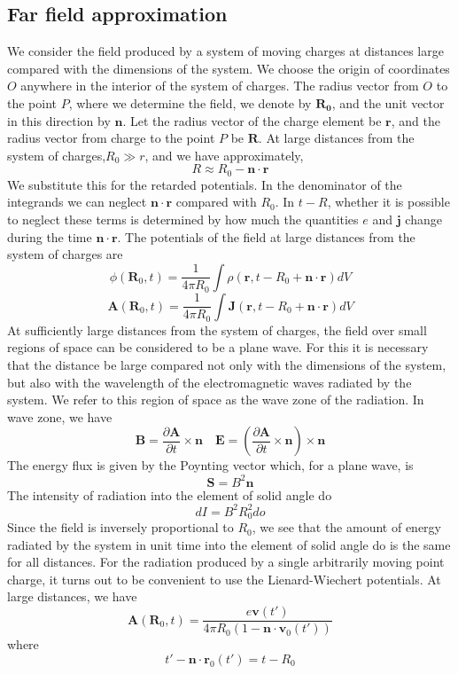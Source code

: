 \subsection{Far field approximation}
We consider the field produced by a system of moving charges at distances large compared with the dimensions of the system. We choose the origin of coordinates $O$ anywhere in the interior of the system of charges. The radius vector from $O$ to the point $P$, where we determine the field, we denote by $\bm{R_0}$, and the unit vector in this direction by $\bm{n}$. Let the radius vector of the charge element be $\bm{r}$, and the radius vector from charge to the point $P$ be $\bm{R}$. At large distances from the system of charges,$R_0 \gg r$, and we have approximately,
\[R \approx R_0 - \bm{n}\cdot\bm{r}\]
We substitute this for the retarded potentials. In the denominator of the integrands we can neglect $\bm{n}\cdot\bm{r}$ compared with $R_0$. In $t-R$, whether it is possible to neglect these terms is determined by how much the quantities $e$ and $\bm{j}$ change during the time $\bm{n}\cdot\bm{r}$. The potentials of the field at large distances from the system of charges are
\[\phi(\bm{R}_0,t) = \frac{1}{4\pi R_0} \int \rho(\bm{r},t-R_0+\bm{n}\cdot\bm{r}) dV\]
\[\bm{A}(\bm{R}_0,t) = \frac{1}{4\pi R_0} \int \bm{J}(\bm{r},t-R_0+\bm{n}\cdot\bm{r}) dV\]
At sufficiently large distances from the system of charges, the field over small regions of space can be considered to be a plane wave. 
For this it is necessary that the distance be large
compared not only with the dimensions of the system, but also with the wavelength of the electromagnetic waves radiated by the system. 
We refer to this region of space as the wave
zone of the radiation.
In wave zone, we have
\[\bm{B} = \frac{\partial \bm{A}}{\partial t} \times \bm{n} \quad \bm{E} = \left(\frac{\partial \bm{A}}{\partial t} \times \bm{n}\right) \times \bm{n}\]
The energy flux is given by the Poynting vector which, for a plane wave, is
\[\bm{S} = B^2\bm{n}\]
The intensity of radiation into the element of solid angle do
\[dI = B^2R_0^2 do\]
Since the field is inversely proportional to $R_0$, we see that the amount of energy radiated by the system in unit time into the element of solid angle do is the same for all distances.
For the radiation produced by a single arbitrarily moving point charge, it turns out to be convenient to use the Lienard-Wiechert potentials. At large distances, we have
\[\bm{A}(\bm{R}_0,t) = \frac{e\bm{v}(t')}{4\pi R_0 (1 - \bm{n}\cdot\bm{v}_0(t'))}\]
where
\[ t'-\bm{n}\cdot\bm{r}_0(t') = t - R_0\]

